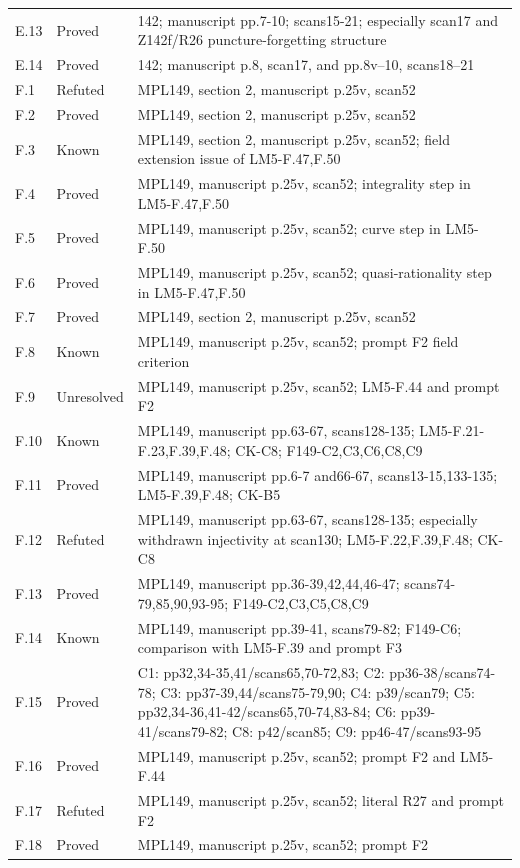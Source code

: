 {\begin{longtable}{p{1.9cm}p{1.7cm}p{10.3cm}}
E.13 & Proved & 142; manuscript pp.7-10; scans15-21; especially scan17 and Z142f/R26 puncture-forgetting structure \\
E.14 & Proved & 142; manuscript p.8, scan17, and pp.8v–10, scans18–21 \\
F.1 & Refuted & MPL149, section 2, manuscript p.25v, scan52 \\
F.2 & Proved & MPL149, section 2, manuscript p.25v, scan52 \\
F.3 & Known & MPL149, section 2, manuscript p.25v, scan52; field extension issue of LM5-F.47,F.50 \\
F.4 & Proved & MPL149, manuscript p.25v, scan52; integrality step in LM5-F.47,F.50 \\
F.5 & Proved & MPL149, manuscript p.25v, scan52; curve step in LM5-F.50 \\
F.6 & Proved & MPL149, manuscript p.25v, scan52; quasi-rationality step in LM5-F.47,F.50 \\
F.7 & Proved & MPL149, section 2, manuscript p.25v, scan52 \\
F.8 & Known & MPL149, manuscript p.25v, scan52; prompt F2 field criterion \\
F.9 & Unresolved & MPL149, manuscript p.25v, scan52; LM5-F.44 and prompt F2 \\
F.10 & Known & MPL149, manuscript pp.63-67, scans128-135; LM5-F.21-F.23,F.39,F.48; CK-C8; F149-C2,C3,C6,C8,C9 \\
F.11 & Proved & MPL149, manuscript pp.6-7 and66-67, scans13-15,133-135; LM5-F.39,F.48; CK-B5 \\
F.12 & Refuted & MPL149, manuscript pp.63-67, scans128-135; especially withdrawn injectivity at scan130; LM5-F.22,F.39,F.48; CK-C8 \\
F.13 & Proved & MPL149, manuscript pp.36-39,42,44,46-47; scans74-79,85,90,93-95; F149-C2,C3,C5,C8,C9 \\
F.14 & Known & MPL149, manuscript pp.39-41, scans79-82; F149-C6; comparison with LM5-F.39 and prompt F3 \\
F.15 & Proved & C1: pp32,34-35,41/scans65,70-72,83; C2: pp36-38/scans74-78; C3: pp37-39,44/scans75-79,90; C4: p39/scan79; C5: pp32,34-36,41-42/scans65,70-74,83-84; C6: pp39-41/scans79-82; C8: p42/scan85; C9: pp46-47/scans93-95 \\
F.16 & Proved & MPL149, manuscript p.25v, scan52; prompt F2 and LM5-F.44 \\
F.17 & Refuted & MPL149, manuscript p.25v, scan52; literal R27 and prompt F2 \\
F.18 & Proved & MPL149, manuscript p.25v, scan52; prompt F2 \\

\end{longtable}}
